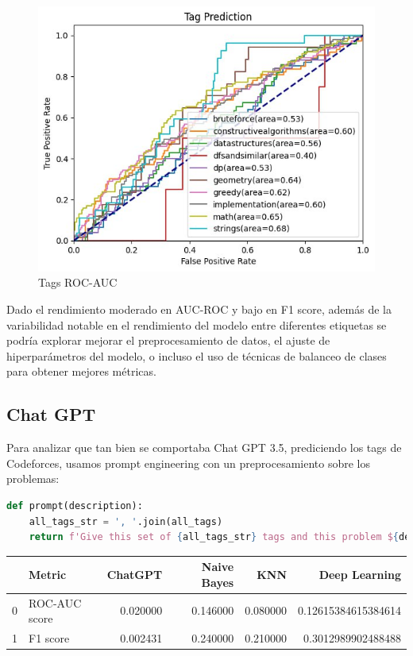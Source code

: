 \documentclass{article}
\begin{document}
\begin{figure}[H]
    \centering
    \includegraphics[scale=0.55]{imgs/roc_auc.jpg}
    \caption{Tags ROC-AUC}
\end{figure}

Dado el rendimiento moderado en AUC-ROC y bajo en F1 score, además de la variabilidad notable en 
el rendimiento del modelo entre diferentes etiquetas se podría explorar mejorar el 
preprocesamiento de datos, el ajuste de hiperparámetros del modelo, o incluso el uso de técnicas 
de balanceo de clases para obtener mejores métricas.


\subsection{Chat GPT}

Para analizar que tan bien se comportaba Chat GPT 3.5, prediciendo los tags de Codeforces, usamos prompt engineering
con un preprocesamiento sobre los problemas:

\begin{lstlisting}[language=Python, caption=Prompt para tagear los problemas]
def prompt(description):
    all_tags_str = ', '.join(all_tags)
    return f'Give this set of {all_tags_str} tags and this problem ${description}, give me the set of problem tags in the following format: greedy, implementation, dp'
\end{lstlisting}

\begin{tabular}{|l|l|r|r|r|r|}
    \toprule
    {} & Metric        & ChatGPT  & Naive Bayes & KNN      & Deep Learning       \\
    \midrule
    0  & ROC-AUC score      & 0.020000 & 0.146000    & 0.080000 & 0.12615384615384614 \\
    1  & F1 score    & 0.002431 & 0.240000    & 0.210000 & 0.3012989902488488  \\
    \bottomrule
\end{tabular}\\\\
\end{document}
